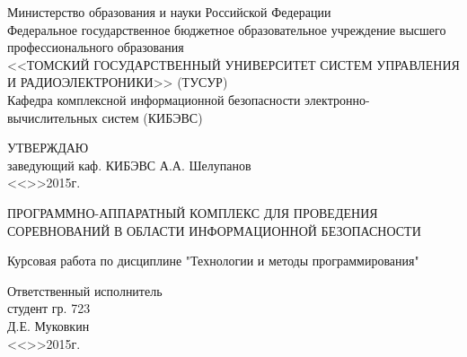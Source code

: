 \newpage
{}

\begin{center}
 Министерство образования и науки Российской Федерации\\
 Федеральное государственное бюджетное образовательное учреждение высшего профессионального образования\\
 <<ТОМСКИЙ ГОСУДАРСТВЕННЫЙ УНИВЕРСИТЕТ СИСТЕМ УПРАВЛЕНИЯ И РАДИОЭЛЕКТРОНИКИ>> (ТУСУР)\\
 Кафедра комплексной информационной безопасности электронно-вычислительных систем (КИБЭВС)\\
\end{center}

\vfill

\begin{flushright}
\begin{minipage}{0.45\textwidth}
 \begin{flushleft}
  УТВЕРЖДАЮ\\
  заведующий каф. КИБЭВС
  \underline{\hspace{3cm}}А.А. Шелупанов \\
  <<\underline{\hspace{1cm}}>>\underline{\hspace{3cm}}2015г.\\
 \end{flushleft}
\end{minipage}
\end{flushright}

\vfill

\begin{center}
ПРОГРАММНО-АППАРАТНЫЙ КОМПЛЕКС ДЛЯ ПРОВЕДЕНИЯ СОРЕВНОВАНИЙ В ОБЛАСТИ ИНФОРМАЦИОННОЙ БЕЗОПАСНОСТИ

Курсовая работа по дисциплине
"Технологии и методы программирования"


\end{center}

\vfill
\begin{flushright}
\begin{minipage}{0.45\textwidth}
 \begin{flushleft}
  Ответственный исполнитель \\
  студент гр. 723 \\
  \underline{\hspace{3cm}}Д.Е. Муковкин \\
  <<\underline{\hspace{1cm}}>>\underline{\hspace{3cm}}2015г.\\
 \end{flushleft}
\end{minipage}
\end{flushright}

